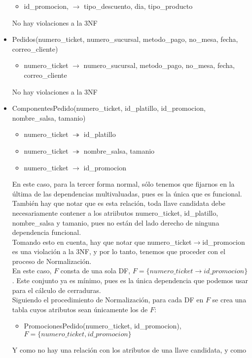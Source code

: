 \documentclass[11pt]{article}
\begin{document}
\begin{itemize}
\begin{itemize}
        \item id\_promocion, $\rightarrow$ tipo\_descuento, dia, tipo\_producto
      \end{itemize}
      No hay violaciones a la 3NF
\item Pedidos(numero\_ticket, numero\_sucursal, metodo\_pago, no\_mesa, fecha, correo\_cliente)
      \begin{itemize}
        \item numero\_ticket $\rightarrow$ numero\_sucursal, metodo\_pago, no\_mesa, fecha, correo\_cliente
      \end{itemize}
      No hay violaciones a la 3NF
\item ComponentesPedido(numero\_ticket, id\_platillo, id\_promocion, nombre\_salsa, tamanio)
      \begin{itemize}
        \item numero\_ticket $\twoheadrightarrow$ id\_platillo
        \item numero\_ticket $\twoheadrightarrow$ nombre\_salsa, tamanio
        \item numero\_ticket $\rightarrow$ id\_promocion
      \end{itemize}
      En este caso, para la tercer forma normal, sólo tenemos que fijarnos en la última de las dependencias multivaluadas, pues es la única que es funcional. También hay que notar que es esta relación, toda llave candidata debe necesariamente contener a los atriibutos numero\_ticket, id\_platillo, nombre\_salsa y tamanio, pues no están del lado derecho de ninguna dependencia funcional.\\
      Tomando esto en cuenta, hay que notar que numero\_ticket$\rightarrow$id\_promocion es una violación a la 3NF, y por lo tanto, tenemos que proceder con el proceso de Normalización.\\
      En este caso, $F$ consta de una sola DF, $F = \{numero\_ticket  \rightarrow id\_promocion\}$. Este conjunto ya es mínimo, pues es la única dependencia que podemos usar para el cálculo de cerraduras. \\
      Siguiendo el procedimiento de Normalización, para cada DF en $F$ se crea una tabla cuyos atributos sean únicamente los de $F$:
      \begin{itemize}
      \item PromocionesPedido(numero\_ticket, id\_promocion), $F = \{numero\_ticket, id\_promocion\}$
      \end{itemize}
      Y como no hay una relación con los atributos de una llave candidata, y como 

\end{itemize}
\end{document}
